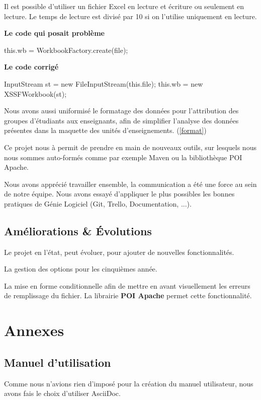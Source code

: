 \documentclass{polytech/polytech}
\begin{document}
	Il est possible d'utiliser un fichier Excel en lecture et écriture ou seulement en lecture.
	Le temps de lecture est divisé par 10 si on l'utilise uniquement en lecture.

	\textbf{Le code qui posait problème}
	\begin{latexsource}
	this.wb = WorkbookFactory.create(file);
	\end{latexsource}

	\textbf{Le code corrigé}
	\begin{latexsource}
	InputStream st = new FileInputStream(this.file);
	this.wb = new XSSFWorkbook(st);
	\end{latexsource}

	Nous avons aussi uniformisé le formatage des données pour l'attribution des groupes d'étudiants aux enseignants, afin de simplifier l'analyse des données présentes dans la maquette des unités d'enseignements. (\ref{format})

	Ce projet nous à permit de prendre en main de nouveaux outils, sur lesquels nous nous sommes auto-formés comme par exemple Maven ou la bibliothèque POI Apache.

	Nous avons apprécié travailler ensemble, la communication a été une force au sein de notre équipe.
	Nous avons essayé d'appliquer le plus possibles les bonnes pratiques de Génie Logiciel (Git, Trello, Documentation, ...).
	
	\section{Améliorations \& Évolutions} 
	
	Le projet en l'état, peut évoluer, pour ajouter de nouvelles fonctionnalités.
	
	La gestion des options pour les cinquièmes année.
	
	La mise en forme conditionnelle afin de mettre en avant visuellement les erreurs de remplissage du fichier.
	La librairie \textbf{POI Apache} permet cette fonctionnalité.
	
	
	

	\chapter{Annexes}

	\section{Manuel d'utilisation}
	Comme nous n'avions rien d'imposé pour la création du manuel utilisateur, nous avons fais le choix d'utiliser AsciiDoc.

	
\end{document}
